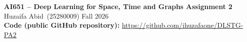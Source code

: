 \documentclass[10pt,a4paper]{article}
\newcommand{\studentname}{Huzaifa Abid}
\newcommand{\studentid}{25280009}
\newcommand{\repourl}{https://github.com/ihuzafaone/DLSTG-PA2}
\begin{document}
\begin{center}
{\large\textbf{AI651 -- Deep Learning for Space, Time and Graphs \; Assignment 2}}\\[2pt]
\studentname\ (\studentid) \quad Fall 2026\\[2pt]
\textbf{Code (public GitHub repository):} \url{\repourl}
\end{center}
\graphicspath{{../figures/}}




\end{document}
